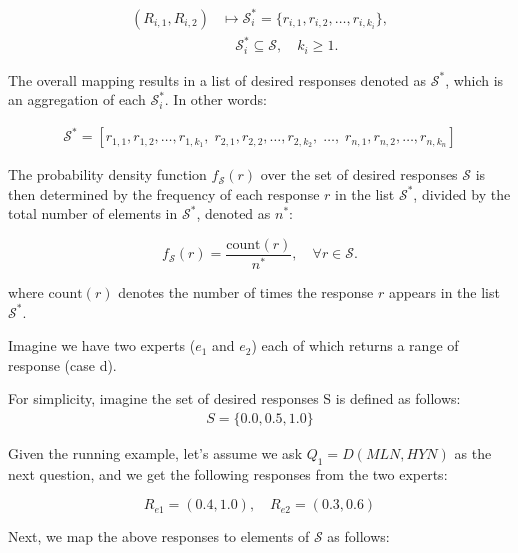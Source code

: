 \begin{enumerate}
\begin{definition}
\begin{enumerate}
\begin{align*}
(R_{i,1}, R_{i,2}) & \mapsto \mathcal{S}_i^* = \{r_{i,1}, r_{i,2}, \ldots, r_{i,k_i}\}, \\
& \quad \mathcal{S}_i^* \subseteq \mathcal{S}, \quad k_i \geq 1.
\end{align*}


The overall mapping results in a list of desired responses denoted as $\mathcal{S}^*$, which is an aggregation of each $\mathcal{S}_i^*$. In other words:

\begin{align*}
\mathcal{S}^* = \left[ r_{1,1}, r_{1,2}, \ldots, r_{1,k_1}, \; 
                     r_{2,1}, r_{2,2}, \ldots, r_{2,k_2}, \; 
                     \ldots, \; 
                     r_{n,1}, r_{n,2}, \ldots, r_{n,k_n} \right]
\end{align*}




The probability density function $f_{\mathcal{S}}(r)$ over the set of desired responses $\mathcal{S}$ is then determined by the frequency of each response $r$ in the list $\mathcal{S}^*$, divided by the total number of elements in $\mathcal{S}^*$, denoted as $n^*$:

\[
f_{\mathcal{S}}(r) = \frac{\text{count}(r)}{n^*}, \quad \forall r \in \mathcal{S}.
\]


where $\text{count}(r)$ denotes the number of times the response $r$ appears in the list $\mathcal{S}^*$. 


\end{enumerate}
\end{definition}


    \begin{example}
        Imagine we have two experts ($e_1$ and $e_2$) each of which returns a range of response (case d).
        
        For simplicity, imagine the set of desired responses S is defined as follows:
        \begin{align*}
            S = \{0.0, 0.5, 1.0\}
        \end{align*}

        Given the running example, let's assume we ask  $Q_1 = D(MLN, HYN)$ as the next question, and we get the following responses from the two experts:

        \[
R_{e1} = (0.4, 1.0), \quad R_{e2} = (0.3, 0.6)
\]

Next, we map the above responses to elements of \( \mathcal{S} \) as follows:


\end{example}
\end{enumerate}
